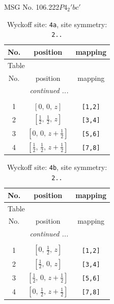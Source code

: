 \documentclass[fleqn,8pt]{jsarticle}
\begin{document}
\setcounter{MaxMatrixCols}{32}

\renewcommand{\tablename}{Table~}
\renewcommand{\figurename}{Figure~}
\begin{center}
\LARGE
MSG No. 106.222\quad$P4_{2}'bc'$
\end{center}
\renewcommand{\arraystretch}{1.2}
\begin{longtable}{ccc}
\caption{Wyckoff site: {\tt 4a}, site symmetry: {\tt 2..}}
 \\
 \hline \hline
No. & position & mapping \\ \hline \endfirsthead

\multicolumn{2}{l}{\tablename\ \thetable{}} \\
 \hline \hline
No. & position & mapping \\ \hline \endhead

 \hline \hline
\multicolumn{2}{r}{\footnotesize\it continued ...} \\ \endfoot

 \hline \hline
\multicolumn{2}{r}{} \\ \endlastfoot

1 & $\left[ 0,\, 0,\, z \right]$ & {\tt [1,2]} \\ \hline
2 & $\left[ \frac{1}{2},\, \frac{1}{2},\, z \right]$ & {\tt [3,4]} \\ \hline
3 & $\left[ 0,\, 0,\, z + \frac{1}{2} \right]$ & {\tt [5,6]} \\ \hline
4 & $\left[ \frac{1}{2},\, \frac{1}{2},\, z + \frac{1}{2} \right]$ & {\tt [7,8]} \\
\end{longtable}
\renewcommand{\arraystretch}{1.2}
\begin{longtable}{ccc}
\caption{Wyckoff site: {\tt 4b}, site symmetry: {\tt 2..}}
 \\
 \hline \hline
No. & position & mapping \\ \hline \endfirsthead

\multicolumn{2}{l}{\tablename\ \thetable{}} \\
 \hline \hline
No. & position & mapping \\ \hline \endhead

 \hline \hline
\multicolumn{2}{r}{\footnotesize\it continued ...} \\ \endfoot

 \hline \hline
\multicolumn{2}{r}{} \\ \endlastfoot

1 & $\left[ 0,\, \frac{1}{2},\, z \right]$ & {\tt [1,2]} \\ \hline
2 & $\left[ \frac{1}{2},\, 0,\, z \right]$ & {\tt [3,4]} \\ \hline
3 & $\left[ \frac{1}{2},\, 0,\, z + \frac{1}{2} \right]$ & {\tt [5,6]} \\ \hline
4 & $\left[ 0,\, \frac{1}{2},\, z + \frac{1}{2} \right]$ & {\tt [7,8]} \\
\end{longtable}
\end{document}
